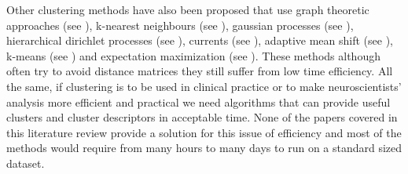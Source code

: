 \documentclass{bioinfo}
\begin{document}
Other clustering methods have also been proposed that use graph
theoretic approaches (see \citet{brun2004clustering, gerig2004analysis,
  ElKouby2005}), k-nearest neighbours (see \citet{Ding2003a,
  moberts2005evaluation}), gaussian processes (see
\citet{wassermann2010unsupervised}), hierarchical dirichlet processes
(see \citet{wang2010tractography}), currents (see \citet{Durrleman2009,
  durrleman2010registration}), adaptive mean shift (see
\citet{zvitia2008adaptive, Zvitia2010}), k-means (see
\citet{ElKouby2005}) and expectation maximization (see
\citet{Maddah_IEEEBI2008}). These methods although often try to avoid
distance matrices they still suffer from low time efficiency. All the
same, if clustering is to be used in clinical practice or to make
neuroscientists' analysis more efficient and practical we need
algorithms that can provide useful clusters and cluster descriptors in
acceptable time. None of the papers covered in this literature review
provide a solution for this issue of efficiency and most of the methods
would require from many hours to many days to run on a standard sized
dataset.






\end{document}
